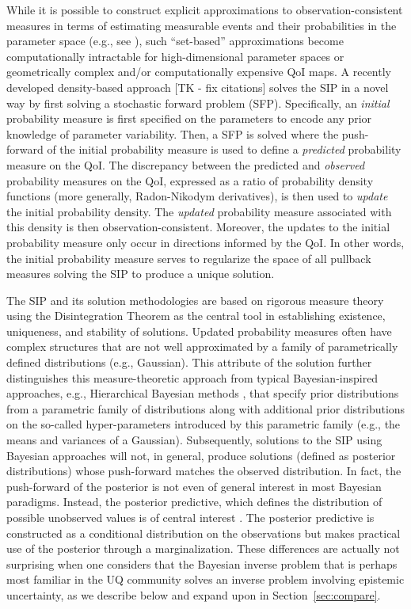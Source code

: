 While it is possible to construct explicit approximations to observation-consistent measures in terms of estimating measurable events and their probabilities in the parameter space (e.g., see \cite{BET+14}), such ``set-based'' approximations become computationally intractable for high-dimensional parameter spaces or geometrically complex and/or computationally expensive QoI maps.
A recently developed density-based approach [TK - fix citations]\cite{BJW18a, BJW18b, BWY20} solves the SIP in a novel way by first solving a stochastic forward problem (SFP).
Specifically, an {\em initial} probability measure is first specified on the parameters to encode any prior knowledge of parameter variability.
Then, a SFP is solved where the push-forward of the initial probability measure is used to define a {\em predicted} probability measure on the QoI.
The discrepancy between the predicted and {\em observed} probability measures on the QoI, expressed as a ratio of probability density functions (more generally, Radon-Nikodym derivatives), is then used to {\em update} the initial probability density.
The {\em updated} probability measure associated with this density is then observation-consistent.
Moreover, the updates to the initial probability measure only occur in directions informed by the QoI.
In other words, the initial probability measure serves to regularize the space of all pullback measures solving the SIP to produce a unique solution.

The SIP and its solution methodologies are based on rigorous measure theory using the Disintegration Theorem \cite{Dellacherie_Meyer_book} as the central tool in establishing existence, uniqueness, and stability of solutions.
Updated probability measures often have complex structures that are not well approximated by a family of parametrically defined distributions (e.g., Gaussian).
This attribute of the solution further distinguishes this measure-theoretic approach from typical Bayesian-inspired approaches, e.g., Hierarchical Bayesian methods \cite{Smith, Tarantola_book}, that specify prior distributions from a parametric family of distributions along with additional prior distributions on the so-called hyper-parameters introduced by this parametric family (e.g., the means and variances of a Gaussian).
Subsequently, solutions to the SIP using Bayesian approaches will not, in general, produce solutions (defined as posterior distributions) whose push-forward matches the observed distribution.
In fact, the push-forward of the posterior is not even of general interest in most Bayesian paradigms.
Instead, the posterior predictive, which defines the distribution of possible unobserved values is of central interest \cite{Smith}.
The posterior predictive is constructed as a conditional distribution on the observations but makes practical use of the posterior through a marginalization.
These differences are actually not surprising when one considers that the Bayesian inverse problem that is perhaps most familiar in the UQ community solves an inverse problem involving epistemic uncertainty, as we describe below and expand upon in Section~\ref{sec:compare}.

